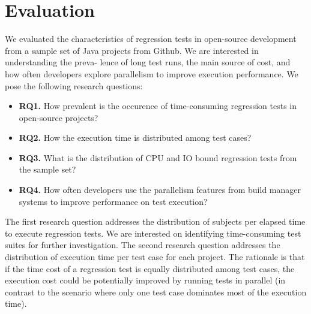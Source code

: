 \section{Evaluation}
\label{sec:eval}


We evaluated the characteristics of regression tests in open-source
development from a sample set of Java projects from
Github. We are interested in understanding the preva- lence
of long test runs, the main source of cost, and how often developers
explore parallelism to improve execution performance. We pose the
following research questions:

\newcommand{\RQA}{How prevalent is the occurence of time-consuming
regression tests in open-source projects?}
\newcommand{\RQB}{What is the distribution of CPU and IO bound
regression tests from the sample set?}
\newcommand{\RQC}{How the execution time is distributed among test
cases?}
\newcommand{\RQD}{How often developers use the parallelism features
from build manager systems to improve performance on test execution?}

\newcommand{\rqOne}{\textbf{RQ1.} \RQA}
\newcommand{\rqTwo}{\textbf{RQ2.} \RQC}
\newcommand{\rqThree}{\textbf{RQ3.} \RQB}
\newcommand{\rqFour}{\textbf{RQ4.} \RQD}

\begin{itemize}
    \item \rqOne
    \item \rqTwo
    \item \rqThree
    \item \rqFour
\end{itemize}

The first research question addresses the distribution of subjects per
elapsed time to execute regression tests. We are interested on
identifying time-consuming test suites for further investigation. The
second research question addresses the distribution of execution time
per test case for each project. The rationale is that if the time cost
of a regression test is equally distributed among test cases, the
execution cost could be potentially improved by running tests in
parallel (in contrast to the scenario where only one test case
dominates most of the execution time).

